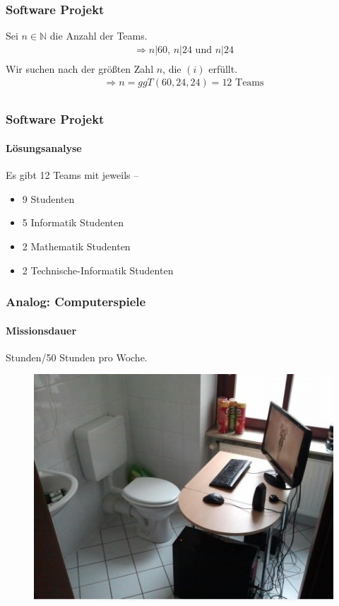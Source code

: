 \documentclass[•]{beamer}
\begin{document}
\begin{frame}
	\frametitle{Software Projekt}
	Sei $n \in \mathbb{N}$ die Anzahl der Teams.
	\pause 
	\begin{align*}
	\Rightarrow n|60 \text{, } n|24 \text{ und } n|24 \tag{i}\\
	\end{align*}
	\pause 
	Wir suchen nach der gr\"o{\ss}ten Zahl $n$, die $(i)$ erf\"ullt.
	\pause 
	\begin{align*}
	\Rightarrow n = \textit{ggT}(60,24,24) = 12 \text{ Teams}\\
	\end{align*}
	
\end{frame}

\begin{frame}
	\frametitle{Software Projekt}
	\framesubtitle{L\"osungsanalyse}
	Es gibt 12 Teams mit jeweils  --\\
	\begin{itemize}
	\item 9 Studenten
	\pause 
	\item 5 Informatik Studenten
	\pause 
	\item 2 Mathematik Studenten
	\pause 
	\item 2 Technische-Informatik Studenten
	\end{itemize}
\end{frame}

\begin{frame}
\frametitle{Analog: Computerspiele}
\framesubtitle{Missionsdauer}
\vspace*{10pt}
 Stunden/50 Stunden pro Woche.\\
\pause 
 \begin{figure}
	\centering
	\includegraphics[scale=0.6]{gamers}
	\end{figure}
\end{frame}
\end{document}
